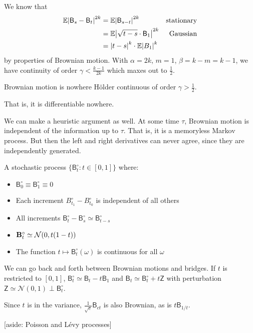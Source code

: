 \documentclass[notes]{agony}
\newcommand{\rv}{\mathsf}
\newcommand{\E}{\mathbb{E}}
\newcommand{\ind}{\perp}
\renewcommand{\N}{\mathcal{N}}
\begin{document}
We know that
\begin{align*}
	\E\abs{\rv B_s - \rv B_t}^{2k}
	 & = \E\abs{\rv B_{s-t}}^{2k}            & \text{stationary} \\
	 & = \E\abs{\sqrt{t-s}\cdot\rv B_1}^{2k} & \text{Gaussian}   \\
	 & = \abs{t-s}^k\cdot\E\abs{B_1}^k
\end{align*}
by properties of Brownian motion.
With $\alpha = 2k$, $m=1$, $\beta=k-m=k-1$,
we have continuity of order $\gamma < \frac{k-1}{2k}$
which maxes out to $\frac12$.

\begin{theorem}[Irregularity]
	Brownian motion is nowhere Hölder continuous of order $\gamma > \frac12$.
\end{theorem}

That is, it is differentiable nowhere.

We can make a heuristic argument as well.
At some time $\tau$, Brownian motion is independent of the information up to $\tau$.
That is, it is a memoryless Markov process.
But then the left and right derivatives can never agree,
since they are independently generated.

\begin{defn}
	A stochastic process $\{\rv B_t^\circ : t \in [0,1]\}$ where:
	\begin{itemize}[nosep]
		\item $\rv B_0^\circ \equiv \rv B_1^\circ \equiv 0$
		\item Each increment $B^\circ_{t_1} - B^\circ_{t_0}$ is independent of all others
		\item All increments $\rv B^\circ_t - \rv B^\circ_s \simeq \rv B^\circ_{t-s}$
		\item $\vb B^\circ_t \simeq \N(0,t(1-t))$
		\item The function $t \mapsto \rv B^\circ_t(\omega)$ is continuous for all $\omega$
	\end{itemize}
\end{defn}

We can go back and forth between Brownian motions and bridges.
If $t$ is restricted to $[0,1]$,
$\rv B_t^\circ \simeq \rv B_t - t\rv B_1$
and $\rv B_t \simeq \rv B_t^\circ + t\rv Z$
with perturbation $\rv Z \simeq \N(0,1) \ind \rv B_t^\circ$.

Since $t$ is in the variance, $\frac{1}{\sqrt{c}}\rv B_{ct}$
is also Brownian, as is $t\rv B_{1/t}$.

[aside: Poisson and Lévy processes]
\end{document}
